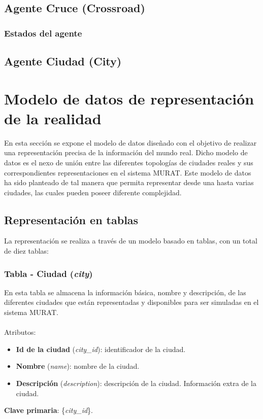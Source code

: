 \subsection{Agente Cruce (Crossroad)}
\subsubsection{Estados del agente}


\subsection{Agente Ciudad (City)}

\renewcommand{\labelitemi}{$\bullet$}
\renewcommand{\labelitemii}{$\circ$}
\renewcommand{\labelitemiii}{$\Rightarrow$}

\newpage
\section{Modelo de datos de representación de la realidad}
En esta sección se expone el modelo de datos diseñado con el objetivo de realizar una representación precisa de la información del mundo real. Dicho modelo de datos es el nexo de unión entre las diferentes topologías de ciudades reales y sus correspondientes representaciones en el sistema MURAT. Este modelo de datos ha sido planteado de tal manera que permita representar desde una hasta varias ciudades, las cuales pueden poseer diferente complejidad.

\subsection{Representación en tablas}
La representación se realiza a través de un modelo basado en tablas, con un total de diez tablas:

\subsubsection{Tabla - Ciudad (\textit{city})}
En esta tabla se almacena la información básica, nombre y descripción, de las diferentes ciudades que están representadas y disponibles para ser simuladas en el sistema MURAT. \\\\
Atributos:
\begin{itemize}
    \item \textbf{Id de la ciudad} (\textit{city\_id}): identificador de la ciudad.
    \item \textbf{Nombre} (\textit{name}): nombre de la ciudad.
    \item \textbf{Descripción} (\textit{description}): descripción de la ciudad. Información extra de la ciudad.
\end{itemize}
\textbf{Clave primaria}: \{\textit{city\_id}\}. \\

